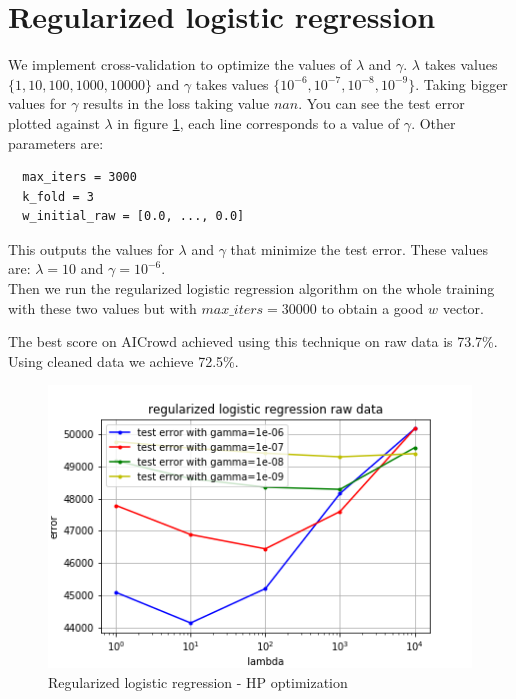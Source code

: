 \documentclass[11pt, a4paper, twocolumn]{article}
\begin{document}
\newpage
\section{Regularized logistic regression}
We implement cross-validation to optimize the values of $\lambda$ and $\gamma$. $\lambda$ takes values
$\{1,10,100,1000,10000\}$ and $\gamma$ takes values $\{10^{-6},10^{-7},10^{-8},10^{-9}\}$. Taking bigger
values for $\gamma$ results in the loss taking value $nan$. You can see the test error plotted against $\lambda$ in figure \ref{fig:raw_reg_log_regr}, each line corresponds to a value of $\gamma$. Other parameters are: 
\begin{lstlisting}
  max_iters = 3000
  k_fold = 3
  w_initial_raw = [0.0, ..., 0.0]
\end{lstlisting}

This outputs the values for $\lambda$ and $\gamma$ that minimize the test error. These values are:
$\lambda = 10$ and $\gamma = 10^{-6}$.\\
Then we run the regularized logistic regression algorithm on the whole training with these two values but with $max\_iters = 30000$ to obtain a good $w$ vector.

The best score on AICrowd achieved using this technique on raw data is 73.7\%. Using cleaned data we achieve 72.5\%.
\begin{figure}[h!]
  \includegraphics[width=\linewidth]{plots/raw_data_reg_log_regr.png}
  \caption{Regularized logistic regression - HP optimization}
  \label{fig:raw_reg_log_regr}
\end{figure}
\end{document}
